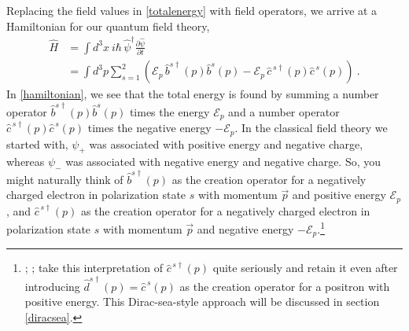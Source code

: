 \documentclass[onecolumn,secnumarabic,amsmath,amssymb,balancelastpage,nofootinbib]{article}
\begin{document}
Replacing the field values in \eqref{totalenergy} with field operators, we arrive at a Hamiltonian for our quantum field theory,
\begin{align}
\widehat{H}&=\int{d^3 x \ i \hbar \, \widehat{\psi}^\dagger\frac{\partial \widehat{\psi}}{\partial t}}
\nonumber
\\
&=\int{d^3 p \sum_{s=1}^2  \left(\mathcal{E}_p\,\widehat{b}^{s\dagger}(p)\widehat{b}^s(p)-\mathcal{E}_p\,\widehat{c}^{\,s\dagger}(p)\widehat{c}^{\,s}(p)\right)}
\ .
\label{hamiltonian}
\end{align}
In \eqref{hamiltonian}, we see that the total energy is found by summing a number operator $\widehat{b}^{s\dagger}(p)\widehat{b}^s(p)$ times the energy $\mathcal{E}_p$ and a number operator $\widehat{c}^{\,s\dagger}(p)\widehat{c}^{\,s}(p)$ times the negative energy $-\mathcal{E}_p$.  In the classical field theory we started with, $\psi_+$ was associated with positive energy and negative charge, whereas $\psi_-$ was associated with negative energy and negative charge.  So, you might naturally think of $\widehat{b}^{s\dagger}(p)$ as the creation operator for a negatively charged electron in polarization state $s$ with momentum $\vec{p}$ and positive energy $\mathcal{E}_p$, and $\widehat{c}^{\,s\dagger}(p)$ as the creation operator for a negatively charged electron in polarization state $s$ with momentum $\vec{p}$ and negative energy $-\mathcal{E}_p$.\footnote{\citet[sec.\ 8a]{schweberQFT}; \citet[sec.\ 13.4]{bjorkendrellfields}; \citet{hatfield} take this interpretation of $\widehat{c}^{\,s\dagger}(p)$ quite seriously and retain it even after introducing $\widehat{d}^{s\dagger}(p)=\widehat{c}^{\,s}(p)$ as the creation operator for a positron with positive energy.  This Dirac-sea-style approach will be discussed in section \ref{diracsea}.}
\end{document}
